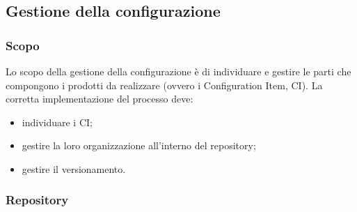   \subsection{Gestione della configurazione}
  \subsubsection{Scopo}
        Lo scopo della gestione della configurazione è di individuare e gestire le parti che compongono i prodotti da realizzare (ovvero i Configuration Item, CI). La corretta implementazione del processo deve:
        \begin{itemize}
            \item individuare i CI;
            \item gestire la loro organizzazione all'interno del repository;
            \item gestire il versionamento.
        \end{itemize}

  \subsubsection{Repository}
